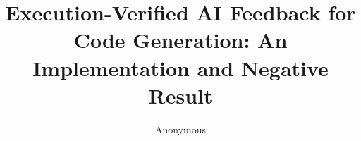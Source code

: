 \documentclass[10pt]{article}
\title{Execution-Verified AI Feedback for Code Generation: An Implementation and Negative Result}
\author{Anonymous}
\date{}
\begin{document}
\maketitle

\begin{abstract}

\end{abstract}











\end{document}
